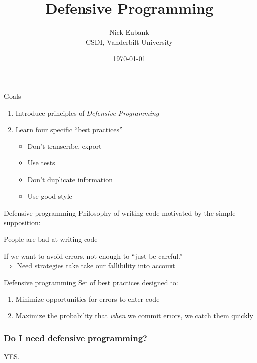 \documentclass[11pt]{beamer}
\title{Defensive Programming}
\author{    \small Nick Eubank \\
            \scriptsize{CSDI, Vanderbilt University}\vspace*{.15in}}
\date{\vspace*{.3in} \today}
\begin{document}
\begin{frame}
    \maketitle
\end{frame}


\begin{frame}[c]{Goals}
\begin{enumerate}
    \item Introduce principles of \emph{Defensive Programming}
    \item Learn four specific ``best practices''
    \begin{itemize}
        \pause \item Don't transcribe, export
        \pause \item Use tests
        \pause \item Don't duplicate information
        \pause \item Use good style
    \end{itemize}
\end{enumerate}
\end{frame}

\begin{frame}[c]{Defensive programming}
Philosophy of writing code \pause motivated by the simple supposition: \\

\begin{center}
    \pause \alert{People are bad at writing code}
\end{center}
\pause If we want to avoid errors, \pause not enough to \alert{``just be careful.''}\\
$\Rightarrow$ Need strategies take take our fallibility into account
\end{frame}


\begin{frame}[c]{Defensive programming}
    Set of best practices designed to:
    \begin{enumerate}
        \pause \item Minimize opportunities for errors to enter code
        \pause \item Maximize the probability that \emph{when} we commit errors, we catch them quickly
    \end{enumerate}
\end{frame}


\begin{frame}\frametitle{Do I need defensive programming?}
\begin{center}
    \pause \LARGE \alert{YES.}
\end{center}
\end{frame}
\end{document}
